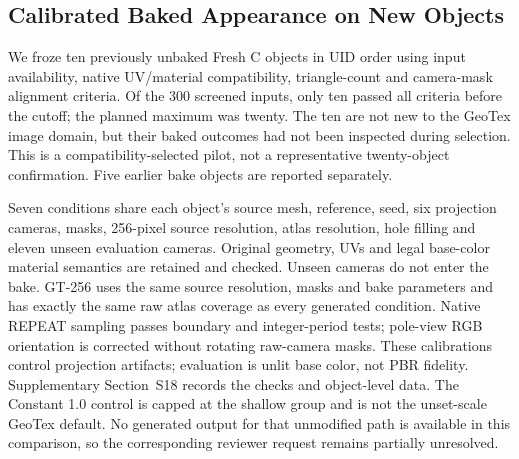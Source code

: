 \documentclass[times,twocolumn,final]{elsarticle}
\providecommand{\DIFadd}[1]{{\protect\color{blue} \sf #1}} %
\providecommand{\DIFaddbegin}{} %
\providecommand{\DIFaddend}{} %
\begin{document}
\subsection{Calibrated Baked Appearance on New Objects}
\label{subsec:new-bake}
\DIFadd{We froze ten previously unbaked Fresh C objects in UID order using input availability, native UV/material compatibility, triangle-count and camera-mask alignment criteria. Of the 300 screened inputs, only ten passed all criteria before the cutoff; the planned maximum was twenty. The ten are not new to the GeoTex image domain, but their baked outcomes had not been inspected during selection. This is a compatibility-selected pilot, not a representative twenty-object confirmation. Five earlier bake objects are reported separately.
}

\DIFadd{Seven conditions share each object's source mesh, reference, seed}\DIFaddend ,   \DIFaddbegin \DIFadd{six projection cameras, masks, 256-pixel source resolution, atlas resolution, hole filling and eleven unseen evaluation cameras. Original geometry, UVs and legal base-color material semantics are retained and checked. Unseen cameras do not enter the bake. GT-256 uses the same source resolution, masks and bake parameters and has exactly the same raw atlas coverage as every generated condition. Native REPEAT sampling passes boundary and integer-period tests; pole-view RGB orientation is corrected without rotating raw-camera masks. These calibrations control projection artifacts; evaluation is unlit base color, not PBR fidelity. Supplementary Section~S18 records the checks and object-level data. The Constant 1.0 control is capped at the shallow group and is not the unset-scale GeoTex default. No generated output for that unmodified path is available in this comparison, so the corresponding reviewer request remains partially unresolved}\DIFaddend .
\end{document}
